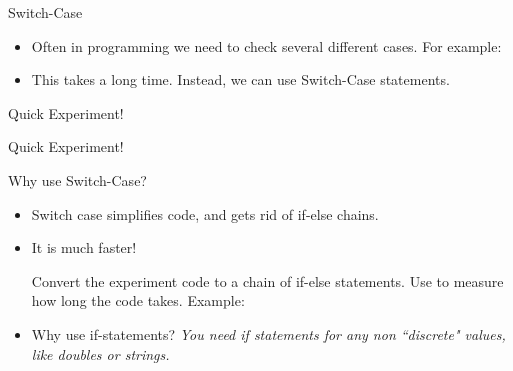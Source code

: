 \begin{frame}[fragile]{Switch-Case}
\begin{itemize}
\item Often in programming we need to check several different cases. For example:
\begin{semiverbatim}\end{semiverbatim}
\item This takes a long time. Instead, we can use Switch-Case statements.
\end{itemize}
\end{frame}

\begin{frame}[fragile]{Quick Experiment!}
\begin{semiverbatim}\end{semiverbatim}
\end{frame}

\begin{frame}[fragile]{Quick Experiment!}
\begin{semiverbatim}\end{semiverbatim}
\end{frame}

\begin{frame}[fragile]{Why use Switch-Case?}
\begin{itemize}
\item Switch case simplifies code, and gets rid of if-else chains. \pause
\item It is much faster!
\begin{center}
Convert the experiment code to a chain of if-else statements. Use \texttt{} to measure how long the code takes. Example: \pause
\end{center}
\begin{semiverbatim}\end{semiverbatim} \pause
\item Why use if-statements? \pause \emph{You need if statements for any non ``discrete" values, like doubles or strings.}
\end{itemize}
\end{frame}


